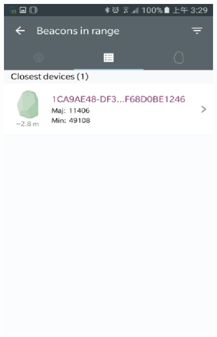 \documentclass[12pt]{report}
\begin{document}
\begin{figure}[!t]
{\begin{minipage}[htb]{0.35\textwidth}
			\includegraphics[width = \textwidth]{pictures/3_4c.eps}
		\end{minipage}
	}
\end{figure}
\end{document}
